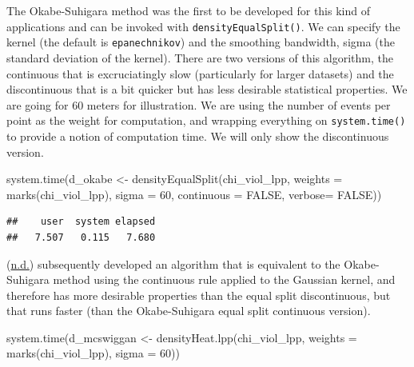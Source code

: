 \documentclass[
  krantz2]{krantz}
\makeatletter
\newenvironment{Shaded}{\begin{snugshade}}{\end{snugshade}}
\newcommand{\AttributeTok}[1]{\textcolor[rgb]{0.61,0.61,0.61}{#1}}
\newcommand{\ConstantTok}[1]{\textcolor[rgb]{0,0,0}{#1}}
\newcommand{\DecValTok}[1]{\textcolor[rgb]{0.06,0.06,0.06}{#1}}
\newcommand{\FunctionTok}[1]{\textcolor[rgb]{0,0,0}{#1}}
\newcommand{\NormalTok}[1]{#1}
\newcommand{\OtherTok}[1]{\textcolor[rgb]{0.37,0.37,0.37}{#1}}
\newenvironment{kframe}{%
\medskip{}
\setlength{\fboxsep}{.8em}
 \def\at@end@of@kframe{}%
 \ifinner\ifhmode%
  \def\at@end@of@kframe{\end{minipage}}%
  \begin{minipage}{\columnwidth}%
 \fi\fi%
 \def\FrameCommand##1{\hskip\@totalleftmargin \hskip-\fboxsep
 \colorbox{shadecolor}{##1}\hskip-\fboxsep
     \hskip-\linewidth \hskip-\@totalleftmargin \hskip\columnwidth}%
 \MakeFramed {\advance\hsize-\width
   \@totalleftmargin\z@ \linewidth\hsize
   \@setminipage}}%
 {\par\unskip\endMakeFramed%
 \at@end@of@kframe}
\renewenvironment{Shaded}{\begin{kframe}}{\end{kframe}}
\makeatother
\begin{document}
The Okabe-Suhigara method was the first to be developed for this kind of applications and can be invoked with \texttt{densityEqualSplit()}. We can specify the kernel (the default is \texttt{epanechnikov}) and the smoothing bandwidth, sigma (the standard deviation of the kernel). There are two versions of this algorithm, the continuous that is excruciatingly slow (particularly for larger datasets) and the discontinuous that is a bit quicker but has less desirable statistical properties. We are going for 60 meters for illustration. We are using the number of events per point as the weight for computation, and wrapping everything on \texttt{system.time()} to provide a notion of computation time. We will only show the discontinuous version.

\begin{Shaded}
\begin{Highlighting}[]
\FunctionTok{system.time}\NormalTok{(d\_okabe }\OtherTok{\textless{}{-}} \FunctionTok{densityEqualSplit}\NormalTok{(chi\_viol\_lpp, }
                                         \AttributeTok{weights =} \FunctionTok{marks}\NormalTok{(chi\_viol\_lpp), }
                                         \AttributeTok{sigma =} \DecValTok{60}\NormalTok{,}
                                         \AttributeTok{continuous =} \ConstantTok{FALSE}\NormalTok{,}
                                         \AttributeTok{verbose=} \ConstantTok{FALSE}\NormalTok{))}
\end{Highlighting}
\end{Shaded}

\begin{verbatim}
##    user  system elapsed 
##   7.507   0.115   7.680
\end{verbatim}

(\protect\hyperlink{ref-McSwiggan_2016}{n.d.}) subsequently developed an algorithm that is equivalent to the Okabe-Suhigara method using the continuous rule applied to the Gaussian kernel, and therefore has more desirable properties than the equal split discontinuous, but that runs faster (than the Okabe-Suhigara equal split continuous version).

\begin{Shaded}
\begin{Highlighting}[]
\FunctionTok{system.time}\NormalTok{(d\_mcswiggan }\OtherTok{\textless{}{-}} \FunctionTok{densityHeat.lpp}\NormalTok{(chi\_viol\_lpp, }
                                    \AttributeTok{weights =} \FunctionTok{marks}\NormalTok{(chi\_viol\_lpp), }
                                    \AttributeTok{sigma =} \DecValTok{60}\NormalTok{))}
\end{Highlighting}
\end{Shaded}
\end{document}
